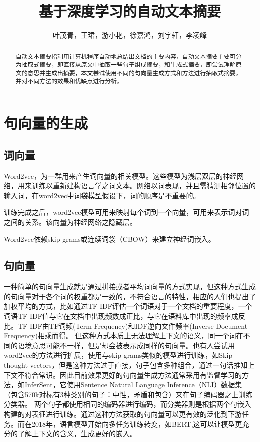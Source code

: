 \documentclass[10pt,twocolumn,letterpaper]{article}
\begin{document}
	
	\title{基于深度学习的自动文本摘要}
	
	\author{叶茂青，王珺，游小艳，徐嘉鸿，刘宇轩，李凌峰}
	
	\maketitle
	
	\begin{abstract}
		自动文本摘要指利用计算机程序自动地总结出文档的主要内容，自动文本摘要主要可分为抽取式摘要，即直接从原文中抽取一些句子组成摘要，和生成式摘要，即尝试理解原文的意思并生成出摘要，本文尝试使用不同的句向量生成方式和方法进行抽取式摘要，并对不同方法的效果和优缺点进行分析。
	\end{abstract}

	\section{句向量的生成}
	
	
	\subsection{词向量}
	Word2vec\cite{mikolov2013efficient}，为一群用来产生词向量的相关模型。这些模型为浅层双层的神经网络，用来训练以重新建构语言学之词文本。网络以词表现，并且需猜测相邻位置的输入词，在word2vec中词袋模型假设下，词的顺序是不重要的。

训练完成之后，word2vec模型可用来映射每个词到一个向量，可用来表示词对词之间的关系。该向量为神经网络之隐藏层。

Word2vec依赖skip-grams或连续词袋（CBOW）来建立神经词嵌入。
	

	\subsection{句向量}
	一种简单的句向量生成就是通过拼接或者平均词向量的方式实现\cite{le2014distributed}，但这种方式生成的句向量对于各个词的权重都是一致的，不符合语言的特性，相应的人们也提出了加权平均的方式，比如通过TF-IDF评估一个词语对于一个文档的重要程度，一个词语TF-IDF值与它在文档中出现频数成正比，与它在语料库中出现的频率成反比。TF-IDF由TF词频(Term Frequency)和IDF逆向文件频率(Inverse Document Frequency)相乘而得。
	但这种方式本质上无法理解上下文的语义，同一个词在不同的语境意思可能不一样，但是却会被表示成同样的句向量。也有人尝试用word2vec的方法进行扩展，使用与skip-grams类似的模型进行训练，如Skip-thought vectors\cite{kiros2015skip}，但是这种方法过于直接，句子包含多种组合，通过一句话推知上下文不符合常识。因此目前效果更好的句向量生成方法通常采用有监督学习的方法，如InferSent\cite{conneau2017supervised}，它使用Sentence Natural Language Inference（NLI）数据集（包含570k对标有3种类别的句子：中性，矛盾和包含）来在句子编码器之上训练分类器。 两个句子都使用相同的编码器进行编码，而分类器则是根据两个句嵌入构建的对表征进行训练。通过这种方法获取的句向量可以更有效的泛化到下游任务。而在2018年，语言模型开始向多任务训练转变，如BERT\cite{devlin2018bert},这可以让模型更充分的了解上下文的含义，生成更好的嵌入。
	
\end{document}
